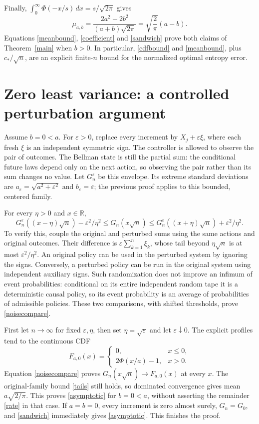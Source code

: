 \documentclass[10pt,a4paper]{article}
\newcommand{\R}{\mathbb R}
\newcommand{\cstar}{c_*}
\begin{document}
Finally, $\int_0^\infty\Phi(-x/s)\,dx=s/\sqrt{2\pi}$ gives
\begin{equation}\label{coefficient}
 \mu_{a,b}
 =\frac{2a^2-2b^2}{(a+b)\sqrt{2\pi}}
 =\sqrt{\frac2\pi}(a-b).
\end{equation}
Equations \eqref{meanbound}, \eqref{coefficient} and \eqref{sandwich}
prove both claims of Theorem~\ref{main} when $b>0$. In particular,
\eqref{cdfbound} and \eqref{meanbound}, plus $\cstar/\sqrt n$, are an
explicit finite-$n$ bound for the normalized optimal entropy error.

\section{Zero least variance: a controlled perturbation argument}
Assume $b=0<a$. For $\varepsilon>0$, replace every increment by
$X_j+\varepsilon\xi$, where each fresh $\xi$ is an independent symmetric
sign. The controller is allowed to observe the pair of outcomes. The Bellman
state is still the partial sum: the conditional future laws depend only on
the next action, so observing the pair rather than its sum changes no value.
Let $G_n^\varepsilon$ be this envelope. Its extreme standard deviations are
$a_\varepsilon=\sqrt{a^2+\varepsilon^2}$ and $b_\varepsilon=\varepsilon$;
the previous proof applies to this bounded, centered family.

For every $\eta>0$ and $x\in\R$,
\begin{equation}\label{noisecompare}
 G_n^\varepsilon((x-\eta)\sqrt n)-\varepsilon^2/\eta^2
 \le G_n(x\sqrt n)
 \le G_n^\varepsilon((x+\eta)\sqrt n)+\varepsilon^2/\eta^2.
\end{equation}
To verify this, couple the original and perturbed sums using the same
actions and original outcomes. Their difference is
$\varepsilon\sum_{k=1}^n\xi_k$, whose tail beyond $\eta\sqrt n$ is at most
$\varepsilon^2/\eta^2$. An original policy can be used in the perturbed
system by ignoring the signs. Conversely, a perturbed policy can be run in
the original system using independent auxiliary signs. Such randomization
does not improve an infimum of event probabilities: conditional on its
entire independent random tape it is a deterministic causal policy, so its
event probability is an average of probabilities of admissible policies.
These two comparisons, with shifted thresholds, prove \eqref{noisecompare}.

First let $n\to\infty$ for fixed $\varepsilon,\eta$, then set
$\eta=\sqrt\varepsilon$ and let $\varepsilon\downarrow0$. The explicit
profiles tend to the continuous CDF
\[
 F_{a,0}(x)=\begin{cases}0,&x\le0,\\2\Phi(x/a)-1,&x>0.\end{cases}
\]
Equation \eqref{noisecompare} proves $G_n(x\sqrt n)\to F_{a,0}(x)$ at
every $x$. The original-family bound \eqref{tails} still holds, so dominated
convergence gives mean $a\sqrt{2/\pi}$. This proves \eqref{asymptotic}
for $b=0<a$, without asserting the remainder \eqref{rate} in that case.
If $a=b=0$, every increment is zero almost surely, $G_n=G_0$, and
\eqref{sandwich} immediately gives \eqref{asymptotic}. This finishes the proof.
\end{document}

